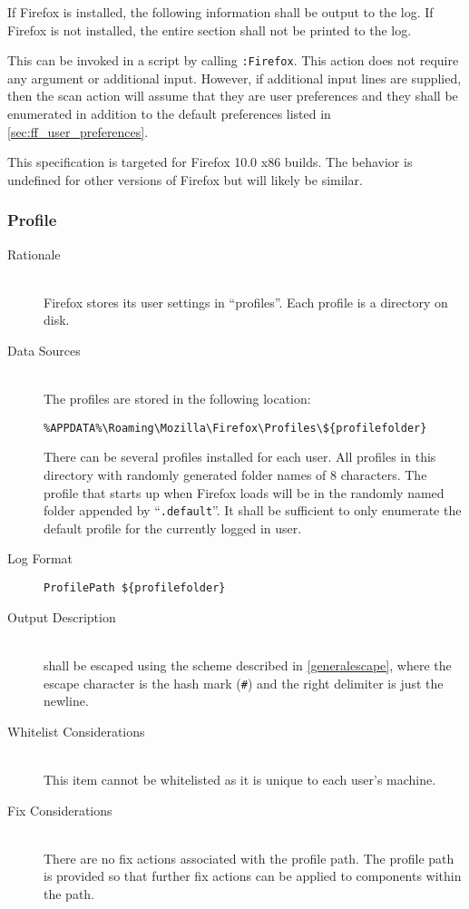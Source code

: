 If Firefox is installed, the following information shall be output to the log. 
If Firefox is not installed, the entire section shall not be printed to the log.

This can be invoked in a script by calling \verb|:Firefox|.  This action does
not require any argument or additional input.  However, if additional input
lines are supplied, then the scan action will assume that they are user
preferences and they shall be enumerated in addition to the default preferences
listed in \ref{sec:ff_user_preferences}.

This specification is targeted for Firefox 10.0 x86 builds.  The behavior is
undefined for other versions of Firefox but will likely be similar.

\subsubsection{Profile}
\begin{description}
\item[Rationale] \hfill \\
Firefox stores its user settings in ``profiles''.  Each profile is a directory
on disk.  
\item[Data Sources] \hfill \\
The profiles are stored in the following location:
\vspace{-\baselineskip}
\begin{verbatim}
%APPDATA%\Roaming\Mozilla\Firefox\Profiles\${profilefolder}
\end{verbatim}
There can be several profiles installed for each user.   All profiles in this
directory with randomly generated folder names of 8 characters.  The profile
that starts up when Firefox loads will be in the randomly named folder appended
by ``\verb|.default|''.  It shall be sufficient to only enumerate the default
profile for the currently logged in user.
\item[Log Format] \hfill 
\vspace{-\baselineskip}
\begin{verbatim}
ProfilePath ${profilefolder}
\end{verbatim}
\item[Output Description] \hfill \\
 shall be escaped using the scheme described in
\ref{generalescape}, where the escape character is the hash mark (\verb|#|) and
the right delimiter is just the newline.
\item[Whitelist Considerations] \hfill \\
This item cannot be whitelisted as it is unique to each user's machine.
\item[Fix Considerations] \hfill \\
There are no fix actions associated with the profile path.  The profile path is
provided so that further fix actions can be applied to components within the
path.
\end{description}

